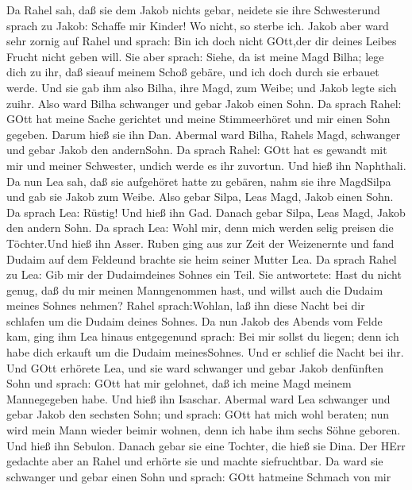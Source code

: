  Da Rahel sah, daß sie dem Jakob nichts gebar, neidete sie
ihre Schwesterund sprach zu Jakob: Schaffe mir Kinder! Wo nicht, so
sterbe ich.  Jakob aber ward sehr zornig auf Rahel und
sprach: Bin ich doch nicht GOtt,der dir deines Leibes Frucht nicht geben
will.  Sie aber sprach: Siehe, da ist meine Magd Bilha; lege
dich zu ihr, daß sieauf meinem Schoß gebäre, und ich doch durch sie
erbauet werde.  Und sie gab ihm also Bilha, ihre Magd, zum
Weibe; und Jakob legte sich zuihr.  Also ward Bilha
schwanger und gebar Jakob einen Sohn.  Da sprach Rahel: GOtt
hat meine Sache gerichtet und meine Stimmeerhöret und mir einen Sohn
gegeben. Darum hieß sie ihn Dan.  Abermal ward Bilha, Rahels
Magd, schwanger und gebar Jakob den andernSohn.  Da sprach
Rahel: GOtt hat es gewandt mit mir und meiner Schwester, undich werde es
ihr zuvortun. Und hieß ihn Naphthali.  Da nun Lea sah, daß
sie aufgehöret hatte zu gebären, nahm sie ihre MagdSilpa und gab sie
Jakob zum Weibe.  Also gebar Silpa, Leas Magd, Jakob einen
Sohn.  Da sprach Lea: Rüstig! Und hieß ihn Gad.
 Danach gebar Silpa, Leas Magd, Jakob den andern Sohn.
 Da sprach Lea: Wohl mir, denn mich werden selig preisen
die Töchter.Und hieß ihn Asser.  Ruben ging aus zur Zeit
der Weizenernte und fand Dudaim auf dem Feldeund brachte sie heim seiner
Mutter Lea. Da sprach Rahel zu Lea: Gib mir der Dudaimdeines Sohnes ein
Teil.  Sie antwortete: Hast du nicht genug, daß du mir
meinen Manngenommen hast, und willst auch die Dudaim meines Sohnes
nehmen? Rahel sprach:Wohlan, laß ihn diese Nacht bei dir schlafen um die
Dudaim deines Sohnes.  Da nun Jakob des Abends vom Felde
kam, ging ihm Lea hinaus entgegenund sprach: Bei mir sollst du liegen;
denn ich habe dich erkauft um die Dudaim meinesSohnes. Und er schlief
die Nacht bei ihr.  Und GOtt erhörete Lea, und sie ward
schwanger und gebar Jakob denfünften Sohn  und sprach: GOtt
hat mir gelohnet, daß ich meine Magd meinem Mannegegeben habe. Und hieß
ihn Isaschar.  Abermal ward Lea schwanger und gebar Jakob
den sechsten Sohn;  und sprach: GOtt hat mich wohl beraten;
nun wird mein Mann wieder beimir wohnen, denn ich habe ihm sechs Söhne
geboren. Und hieß ihn Sebulon.  Danach gebar sie eine
Tochter, die hieß sie Dina.  Der HErr gedachte aber an
Rahel und erhörte sie und machte siefruchtbar.  Da ward sie
schwanger und gebar einen Sohn und sprach: GOtt hatmeine Schmach von mir
